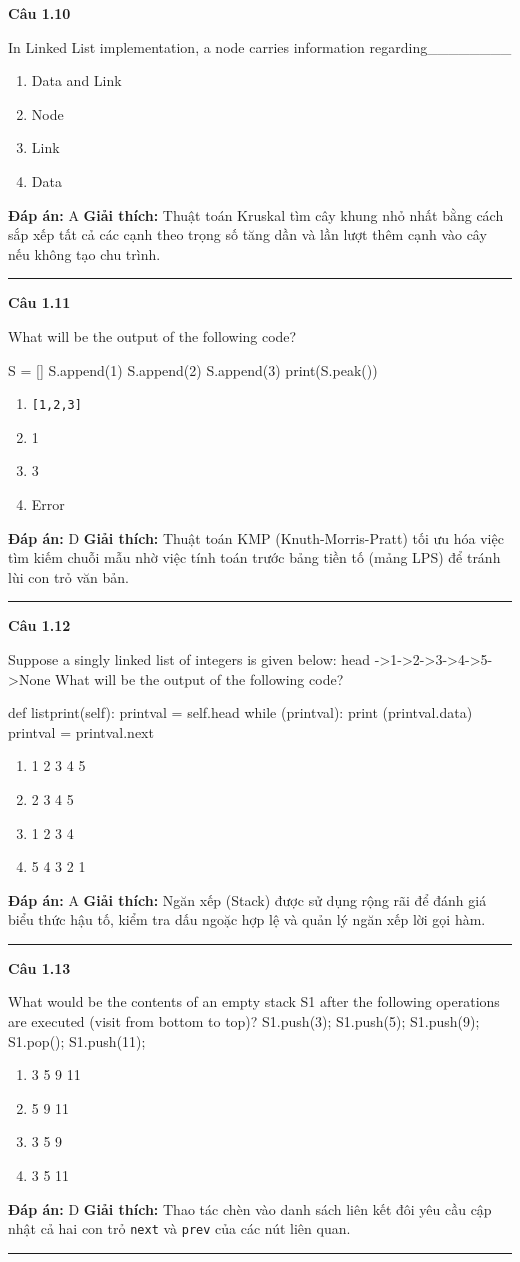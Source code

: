 \documentclass[11pt,a4paper]{article}
\newenvironment{question}[1]{%
  \par\vspace{1em}\noindent\textbf{\large Câu #1}\par\vspace{0.4em}
}{%
  \par\vspace{1em}\hrule\vspace{0.6em}
}
\newenvironment{choices}{%
  \begin{enumerate}[label=\textbf{\Alph*.},leftmargin=2.2em,itemsep=2pt,topsep=3pt]
}{%
  \end{enumerate}
}
\newcommand{\choice}{\item}
\newenvironment{codebox}{%
  \begin{tcolorbox}[colback=gray!8!white,colframe=gray!50!black,arc=1.5mm,boxrule=0.6pt,left=3mm,right=3mm,top=2.5mm,bottom=2.5mm]
  \ttfamily\small
}{%
  \end{tcolorbox}
}
\begin{document}
\begin{question}{1.10}
In Linked List implementation, a node carries information regarding\_\_\_\_\_\_\_\_
\begin{choices}
\choice Data and Link
\choice Node
\choice Link
\choice Data
\end{choices}
\textbf{Đáp án:} A
\textbf{Giải thích:} Thuật toán Kruskal tìm cây khung nhỏ nhất bằng cách sắp xếp tất cả các cạnh theo trọng số tăng dần và lần lượt thêm cạnh vào cây nếu không tạo chu trình.
\end{question}

\begin{question}{1.11}
What will be the output of the following code?
\begin{codebox}
S = []
S.append(1)
S.append(2)
S.append(3)
print(S.peak())
\end{codebox}
\begin{choices}
\choice \texttt{[1,2,3]}
\choice 1
\choice 3
\choice Error
\end{choices}
\textbf{Đáp án:} D
\textbf{Giải thích:} Thuật toán KMP (Knuth-Morris-Pratt) tối ưu hóa việc tìm kiếm chuỗi mẫu nhờ việc tính toán trước bảng tiền tố (mảng LPS) để tránh lùi con trỏ văn bản.
\end{question}

\begin{question}{1.12}
Suppose a singly linked list of integers is given below: head ->1->2->3->4->5->None What will be the output of the following code?
\begin{codebox}
def listprint(self):
    printval = self.head
    while (printval):
        print (printval.data)
        printval = printval.next
\end{codebox}
\begin{choices}
\choice 1 2 3 4 5
\choice 2 3 4 5
\choice 1 2 3 4
\choice 5 4 3 2 1
\end{choices}
\textbf{Đáp án:} A
\textbf{Giải thích:} Ngăn xếp (Stack) được sử dụng rộng rãi để đánh giá biểu thức hậu tố, kiểm tra dấu ngoặc hợp lệ và quản lý ngăn xếp lời gọi hàm.
\end{question}

\begin{question}{1.13}
What would be the contents of an empty stack S1 after the following operations are executed (visit from bottom to top)? S1.push(3); S1.push(5); S1.push(9); S1.pop(); S1.push(11);
\begin{choices}
\choice 3 5 9 11
\choice 5 9 11
\choice 3 5 9
\choice 3 5 11
\end{choices}
\textbf{Đáp án:} D
\textbf{Giải thích:} Thao tác chèn vào danh sách liên kết đôi yêu cầu cập nhật cả hai con trỏ \texttt{next} và \texttt{prev} của các nút liên quan.
\end{question}
\end{document}
